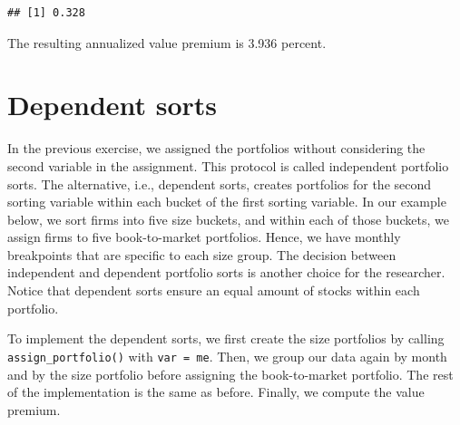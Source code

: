 \documentclass[
]{krantz}
\newenvironment{Shaded}{\begin{snugshade}}{\end{snugshade}}
\newcommand{\AttributeTok}[1]{\textcolor[rgb]{0.61,0.61,0.61}{#1}}
\newcommand{\DecValTok}[1]{\textcolor[rgb]{0.06,0.06,0.06}{#1}}
\newcommand{\FunctionTok}[1]{\textcolor[rgb]{0,0,0}{#1}}
\newcommand{\NormalTok}[1]{#1}
\newcommand{\OtherTok}[1]{\textcolor[rgb]{0.37,0.37,0.37}{#1}}
\newcommand{\SpecialCharTok}[1]{\textcolor[rgb]{0,0,0}{#1}}
\newcommand{\StringTok}[1]{\textcolor[rgb]{0.5,0.5,0.5}{#1}}
\begin{document}
\begin{Shaded}
\end{Shaded}

\begin{verbatim}
## [1] 0.328
\end{verbatim}

The resulting annualized value premium is 3.936 percent.

\hypertarget{dependent-sorts}{%
\section{Dependent sorts}\label{dependent-sorts}}

In the previous exercise, we assigned the portfolios without considering the second variable in the assignment. This protocol is called independent portfolio sorts. The alternative, i.e., dependent sorts, creates portfolios for the second sorting variable within each bucket of the first sorting variable. In our example below, we sort firms into five size buckets, and within each of those buckets, we assign firms to five book-to-market portfolios. Hence, we have monthly breakpoints that are specific to each size group. The decision between independent and dependent portfolio sorts is another choice for the researcher. Notice that dependent sorts ensure an equal amount of stocks within each portfolio.

To implement the dependent sorts, we first create the size portfolios by calling \texttt{assign\_portfolio()} with \texttt{var\ =\ me}. Then, we group our data again by month and by the size portfolio before assigning the book-to-market portfolio. The rest of the implementation is the same as before. Finally, we compute the value premium.
\end{document}
